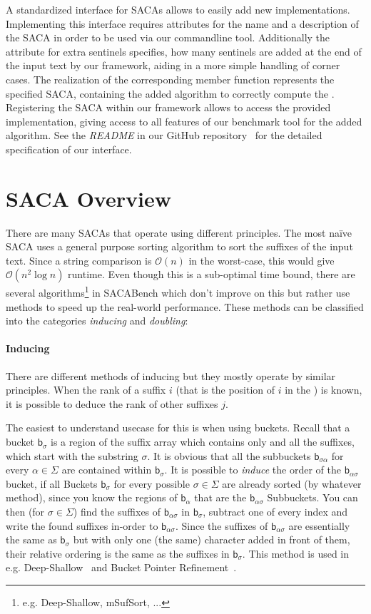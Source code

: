 A standardized interface for SACAs allows to easily add new implementations. Implementing this interface requires attributes for the name and a description of the SACA in order to be used via our commandline tool. Additionally the attribute for extra sentinels specifies, how many sentinels are added at the end of the input text by our framework, aiding in a more simple handling of corner cases. The realization of the corresponding member function represents the specified SACA, containing the added algorithm to correctly compute the \sa. Registering the SACA within our framework allows \sacabench to access the provided implementation, giving access to all features of our benchmark tool for the added algorithm.
See the \emph{README} in our GitHub repository~\cite{sacabench:github} for the detailed specification of our interface.
\section{SACA Overview}

There are many SACAs that operate using different principles.
The most na\"ive SACA uses a general purpose sorting algorithm to sort the suffixes of the input text.
Since a string comparison is $\mathcal O (n)$ in the worst-case, this would give $\mathcal O (n^2 \log n)$ runtime.
Even though this is a sub-optimal time bound,
there are several algorithms\footnote{e.g. Deep-Shallow, mSufSort, ...} in SACABench which don't improve on this
but rather use methods to speed up the real-world performance.
These methods can be classified into the categories \emph{inducing} and \emph{doubling}:
%
\paragraph{Inducing} %
There are different methods of inducing but they mostly operate by similar principles.
When the rank of a suffix $i$ (that is the position of $i$ in the \sa) is known,
it is possible to deduce the rank of other suffixes $j$.

The easiest to understand usecase for this is when using buckets.
Recall that a bucket $\mathsf b_{\sigma}$ is a region of the suffix
array which contains only and all the suffixes,
which start with the substring $\sigma$.
It is obvious that all the subbuckets $\mathsf b_{\sigma\alpha}$ for
every $\alpha \in \Sigma$ are contained within $\mathsf b_\sigma$.
It is possible to \emph{induce} the order of the $\mathsf b_{\alpha\sigma}$ bucket,
if all Buckets $\mathsf b_\sigma$ for every possible $\sigma \in \Sigma$ are already sorted (by whatever method),
since you know the regions of $\mathsf b_\alpha$ that are the $\mathsf b_{\alpha\sigma}$ Subbuckets.
You can then (for $\sigma \in \Sigma$) find the suffixes of $\mathsf b_{\alpha\sigma}$ in $\mathsf b_{\sigma}$,
subtract one of every index and write the found suffixes in-order to $\mathsf b_{\alpha\sigma}$.
Since the suffixes of $\mathsf b_{\alpha\sigma}$ are essentially the same as $\mathsf b_\sigma$ but
with only one (the same) character added in front of them,
their relative ordering is the same as the suffixes in $\mathsf b_\sigma$.
This method is used in e.g. Deep-Shallow~\cite{saca:4} and 
Bucket Pointer Refinement~\cite{saca:2}.


